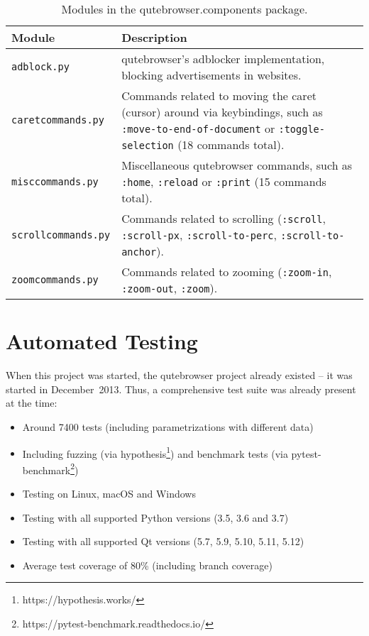 \begin{table}[H]
  \centering
  \begin{tabulary}{\linewidth}{lL}
    \toprule
    Module & Description \\
    \midrule
    \verb|adblock.py| & qutebrowser's adblocker implementation, blocking
                         advertisements in websites. \\
    \verb|caretcommands.py| & Commands related to moving the caret
                              (cursor) around via keybindings, such as
                              \verb|:move-to-end-of-document| or
                              \verb|:toggle-selection| (18 commands total). \\
    \verb|misccommands.py| & Miscellaneous qutebrowser commands, such as
                             \verb|:home|, \verb|:reload| or \verb|:print| (15
                             commands total). \\
    \verb|scrollcommands.py| & Commands related to scrolling (\verb|:scroll|,
                               \verb|:scroll-px|, \verb|:scroll-to-perc|,
                               \verb|:scroll-to-anchor|). \\
    \verb|zoomcommands.py| & Commands related to zooming (\verb|:zoom-in|,
                             \verb|:zoom-out|, \verb|:zoom|). \\
    \bottomrule
  \end{tabulary}
  \caption{Modules in the qutebrowser.components package.}
\end{table}

\section{Automated Testing}
When this project was started, the qutebrowser project already existed -- it was
started in December~2013. Thus, a comprehensive test suite was already present
at the time:

\begin{itemize}[parsep=5pt]
  \item Around 7400 tests (including parametrizations with different data)
  \item Including fuzzing (via hypothesis\footnote{https://hypothesis.works/})
    and benchmark tests (via pytest-benchmark\footnote{https://pytest-benchmark.readthedocs.io/})
  \item Testing on Linux, macOS and Windows
  \item Testing with all supported Python versions (3.5, 3.6 and 3.7)
  \item Testing with all supported Qt versions (5.7, 5.9, 5.10, 5.11, 5.12)
  \item Average test coverage of 80\% (including branch coverage)
\end{itemize}

